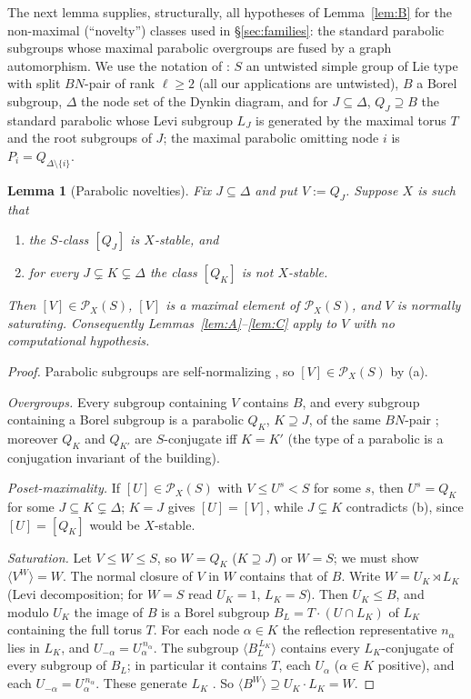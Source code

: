 \documentclass[11pt]{amsart}
\newtheorem{lemma}[theorem]{Lemma}
\theoremstyle{definition}
\theoremstyle{remark}
\newcommand{\Pos}{\mathcal{P}}
\begin{document}
The next lemma supplies, structurally, all hypotheses of
Lemma~\ref{lem:B} for the non-maximal (``novelty'') classes used in
\S\ref{sec:families}: the standard parabolic subgroups whose maximal
parabolic overgroups are fused by a graph automorphism. We use the
notation of \cite{Carter}: $S$ an untwisted simple group of Lie type
with split $BN$-pair of rank $\ell\geq2$ (all our applications are
untwisted), $B$ a Borel subgroup,
$\Delta$ the node set of the Dynkin diagram, and for
$J\subseteq\Delta$, $Q_J\supseteq B$ the standard parabolic whose Levi
subgroup $L_J$ is generated by the maximal torus $T$ and the root
subgroups of $J$; the maximal parabolic omitting node $i$ is
$P_i=Q_{\Delta\setminus\{i\}}$.

\begin{lemma}[Parabolic novelties]\label{lem:P}
Fix $J\subseteq\Delta$ and put $V:=Q_J$. Suppose $X$ is such that
\begin{enumerate}
\item[(a)] the $S$-class $[Q_J]$ is $X$-stable, and
\item[(b)] for every $J\subsetneq K\subsetneq\Delta$ the class $[Q_K]$
is \emph{not} $X$-stable.
\end{enumerate}
Then $[V]\in\Pos_X(S)$, $[V]$ is a maximal element of $\Pos_X(S)$, and
$V$ is normally saturating. Consequently Lemmas~\ref{lem:A}--\ref{lem:C}
apply to $V$ with no computational hypothesis.
\end{lemma}

\begin{proof}
Parabolic subgroups are self-normalizing \cite[Thm.~8.4.4]{Carter}, so
$[V]\in\Pos_X(S)$ by (a).

\emph{Overgroups.} Every subgroup containing $V$ contains $B$, and every
subgroup containing a Borel subgroup is a parabolic $Q_K$, $K\supseteq J$,
of the same $BN$-pair \cite[Thms.~8.3.2, 8.4.3]{Carter}; moreover $Q_K$
and $Q_{K'}$ are $S$-conjugate iff $K=K'$ (the type of a parabolic is a
conjugation invariant of the building).

\emph{Poset-maximality.} If $[U]\in\Pos_X(S)$ with $V\leq U^s<S$ for some
$s$, then $U^s=Q_K$ for some $J\subseteq K\subsetneq\Delta$; $K=J$ gives
$[U]=[V]$, while $J\subsetneq K$ contradicts (b), since $[U]=[Q_K]$ would
be $X$-stable.

\emph{Saturation.} Let $V\leq W\leq S$, so $W=Q_K$ ($K\supseteq J$) or
$W=S$; we must show $\langle V^W\rangle=W$. The normal closure of $V$ in
$W$ contains that of $B$. Write $W=U_K\rtimes L_K$ (Levi decomposition;
for $W=S$ read $U_K=1$, $L_K=S$). Then $U_K\leq B$, and modulo $U_K$ the
image of $B$ is a Borel subgroup $B_L=T\cdot(U\cap L_K)$ of $L_K$
containing the full torus $T$. For each node $\alpha\in K$ the
reflection representative $n_\alpha$ lies in $L_K$, and
$U_{-\alpha}=U_\alpha^{\,n_\alpha}$. The subgroup
$\langle B_L^{\,L_K}\rangle$ contains every $L_K$-conjugate of every
subgroup of $B_L$; in particular it contains $T$, each $U_\alpha$
($\alpha\in K$ positive), and each $U_{-\alpha}=U_\alpha^{\,n_\alpha}$.
These generate $L_K$ \cite[Thm.~8.1.5 with \S7.2]{Carter}. So
$\langle B^W\rangle\supseteq U_K\cdot L_K=W$.
\end{proof}
\end{document}
